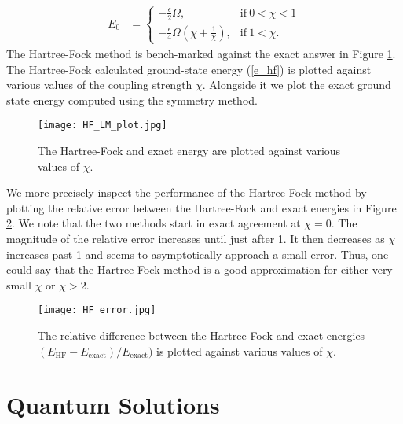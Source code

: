 \documentclass[Dual]{msu-thesis}
\begin{document}
\begin{align}
\label{e_hf}
E_0
&=
\begin{cases}
-\frac{\epsilon}{2}\Omega, & \text{if} \ 0<\chi<1
\\
-\frac{\epsilon}{4}\Omega\left(\chi+\frac{1}{\chi}\right), & \text{if} \ 1<\chi.
\end{cases}
\end{align}
The Hartree-Fock method is bench-marked against the exact answer in Figure \ref{fig:e0}. The Hartree-Fock calculated ground-state energy (\ref{e_hf}) is plotted against various values of the coupling strength $\chi$. Alongside it we plot the exact ground state energy computed using the symmetry method.
\begin{figure}
    \centering
    \texttt{[image: HF\_LM\_plot.jpg]}
    \caption{The Hartree-Fock and exact energy are plotted against various values of $\chi$.}
    \label{fig:e0}
\end{figure}
We more precisely inspect the performance of the Hartree-Fock method by plotting the relative error between the Hartree-Fock and exact energies in Figure \ref{fig:hfe}. We note that the two methods start in exact agreement at $\chi=0$. The magnitude of the relative error increases until just after 1. It then decreases as $\chi$ increases past 1 and seems to asymptotically approach a small error. Thus, one could say that the Hartree-Fock method is a good approximation for either very small $\chi$ or $\chi>2$.
\begin{figure}
    \centering
    \texttt{[image: HF\_error.jpg]}
    \caption{The relative difference between the Hartree-Fock and exact energies $(E_{\text{HF}}-E_{\text{exact}})/E_{\text{exact}})$ is plotted against various values of $\chi$.}
    \label{fig:hfe}
\end{figure}

\section{Quantum Solutions}
\end{document}
